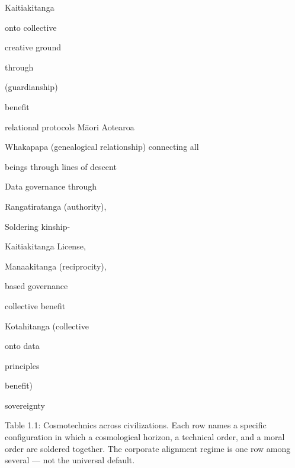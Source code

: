 Kaitiakitanga

onto collective

creative ground

through

(guardianship)

benefit

relational protocols Māori Aotearoa

Whakapapa (genealogical relationship) connecting all

beings through lines of descent

Data governance through

Rangatiratanga (authority),

Soldering kinship-

Kaitiakitanga License,

Manaakitanga (reciprocity),

based governance

collective benefit

Kotahitanga (collective

onto data

principles

benefit)

sovereignty

Table 1.1: Cosmotechnics across civilizations. Each row names a specific configuration in which a cosmological horizon, a technical order, and a moral order are soldered together. The corporate alignment regime is one row among several — not the universal default.

